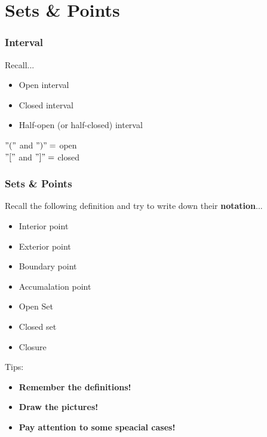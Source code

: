 \documentclass{beamer}
\begin{document}
\section{Sets \& Points}
\begin{frame}
    \frametitle{Interval}
    Recall...\\
    \begin{itemize}
        \item Open interval 
        \item Closed interval 
        \item Half-open (or half-closed) interval
    \end{itemize}
    \vspace{2em}
    \hspace{1em}
    $"("$ and $ ")"=$ open \\
    \hspace{1em}
    $"["$ and $ "]"=$ closed \\
\end{frame}
\begin{frame}
    \frametitle{Sets \& Points}
    Recall the following definition and try to write down their \textbf{notation}...\\
    \begin{itemize}
        \item Interior point
        \item Exterior point
        \item Boundary point
        \item Accumalation point
        \item Open Set
        \item Closed set
        \item Closure 
    \end{itemize}
    \vspace{0.5em}
    Tips:\\
    \begin{itemize}
        \item \textbf{Remember the definitions!}\\
        \item \textbf{Draw the pictures!}\\
        \item \textbf{Pay attention to some speacial cases!}
    \end{itemize}
\end{frame}
\end{document}
